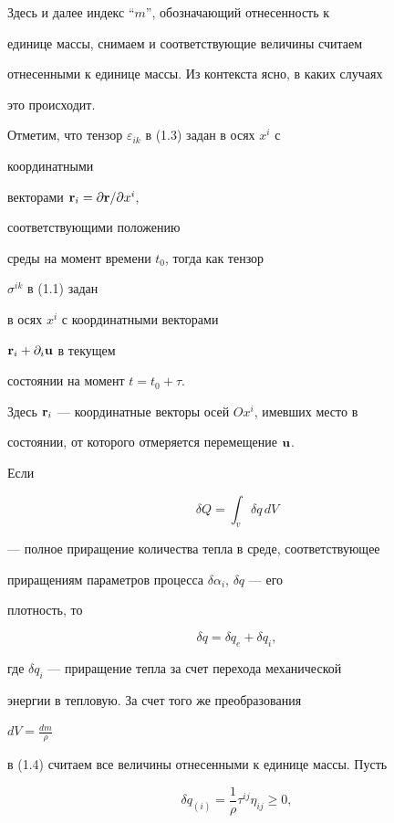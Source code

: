 Здесь и далее индекс ``$m$'', обозначающий отнесенность к


единице массы, снимаем и соответствующие величины считаем


отнесенными к единице массы. Из контекста ясно, в каких случаях


это происходит.





Отметим, что тензор $\varepsilon_{ik}$ в (1.3) задан в осях $x^i$ с


координатными


векторами ${\bold r}_i=\partial{\bold r}/\partial x^i$,


соответствующими положению


среды на момент времени $t_0$, тогда как тензор


$\sigma^{ik}$ в (1.1) задан


в осях $x^i$ с координатными векторами


${\bold r}_i+\partial_i{\bold u}$ в текущем


состоянии на момент $t=t_0+\tau$.


Здесь ${\bold r}_i$ --- координатные векторы осей $Ox^i$, имевших место в


состоянии, от которого отмеряется перемещение $\bold u$.


Если


$$


\delta Q=\int_v\delta q\,dV


$$


--- полное приращение количества тепла в среде, соответствующее


приращениям параметров процесса $\delta\alpha_i$, $\delta q$ --- его


плотность, то


\begin{equation}


\delta q=\delta q_e+\delta q_i,\tag{1.4}


\end{equation}


где $\delta q_i$ --- приращение тепла за счет перехода механической


энергии в тепловую. За счет того же преобразования


$dV=\frac{dm}{\rho }$


в (1.4) считаем все величины отнесенными к единице массы. Пусть


\begin{equation}


\delta q_{(i)}=\frac{1}{\rho }\tau^{ij}\eta_{ij}\ge 0,\tag{1.5}


\end{equation}


